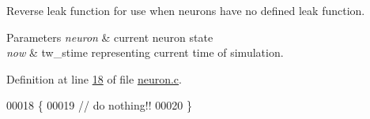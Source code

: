 Reverse leak function for use when neurons have no defined leak function. 


\begin{DoxyParams}{Parameters}
{\em neuron} & current neuron state \\
\hline
{\em now} & tw\+\_\+stime representing current time of simulation. \\
\hline
\end{DoxyParams}


Definition at line \hyperlink{neuron_8c_source_l00018}{18} of file \hyperlink{neuron_8c_source}{neuron.\+c}.


\begin{DoxyCode}
00018                                            \{
00019   \textcolor{comment}{// do nothing!!}
00020 \}
\end{DoxyCode}
